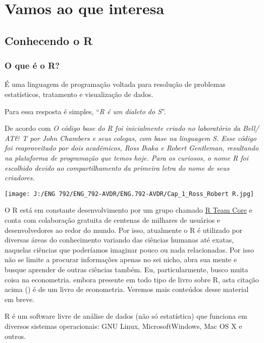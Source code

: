 \documentclass[
]{book}
\begin{document}
\hypertarget{vamos-ao-que-interesa}{%
\chapter{Vamos ao que interesa}\label{vamos-ao-que-interesa}}

\hypertarget{conhecendo-o-r}{%
\section{Conhecendo o R}\label{conhecendo-o-r}}

\hypertarget{o-que-uxe9-o-r}{%
\subsection{O que é o R?}\label{o-que-uxe9-o-r}}

É uma linguagem de programação voltada para resolução de problemas estatísticos, tratamento e visualização de dados.

Para \citet{RogerPeng2020RPro} essa resposta é simples, ``\emph{R é um dialeto do S}''.

De acordo com \citet{perlin2018processamento} \emph{O código base do R foi inicialmente criado no laboratório da Bell/ AT\& T por John Chambers e seus colegas, com base na linguagem S. Esse código foi reaproveitado por dois acadêmicos, Ross Ihaka e Robert Gentleman, resultando na plataforma de programação que temos hoje. Para os curiosos, o nome R foi escolhido devido ao compartilhamento da primeira letra do nome de seus criadores.}

\texttt{[image: J:/ENG 792/ENG\_792-AVDR/ENG.792-AVDR/Cap\_1\_Ross\_Robert R.jpg]}

O R está em constante desenvolvimento por um grupo chamado \href{https://www.r-project.org/}{R Team Core} e conta com colaboração gratuita de centenas de milhares de usuários e desenvolvedores ao redor do mundo.
Por isso, atualmente o R é utilizado por diversas áreas do conhecimento variando das ciências humanas até exatas, naquelas ciências que poderíamos imaginar pouco ou nada relacionadas. Por isso não se limite a procurar informações apenas no sei nicho, abra sua mente e busque aprender de outras ciências também. Eu, particularmente, busco muita coisa na econometria. embora presente em todo tipo de livro sobre R, asta citação acima (\citet{perlin2018processamento}) é de um livro de econometria. Veremos mais conteúdos desse material em breve.

R é um software livre de análise de dados (não só estatística) que funciona em diversos sistemas operacionais: GNU Linux, MicrosoftWindows, Mac OS X e outros.
\end{document}
